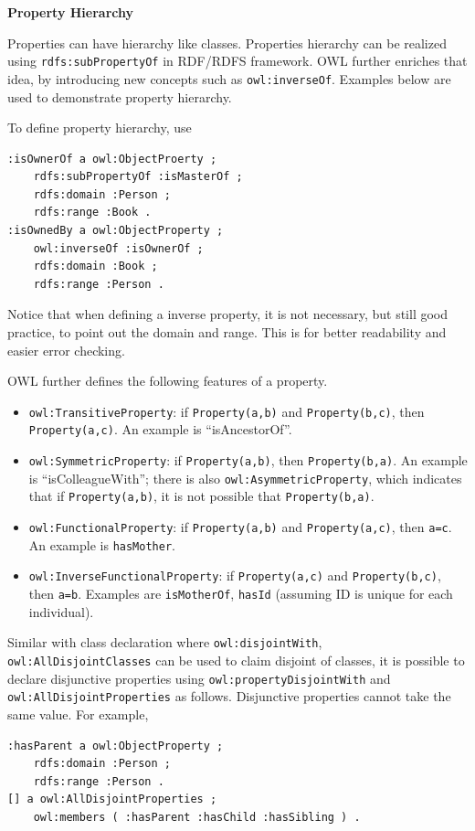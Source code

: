 \vspace{0.1in}
\noindent \textbf{Property Hierarchy}
\vspace{0.1in}

Properties can have hierarchy like classes. Properties hierarchy can be realized using \verb|rdfs:subPropertyOf| in RDF/RDFS framework. OWL further enriches that idea, by introducing new concepts such as \verb|owl:inverseOf|. Examples below are used to demonstrate property hierarchy.

To define property hierarchy, use
\begin{lstlisting}
:isOwnerOf a owl:ObjectProerty ;
	rdfs:subPropertyOf :isMasterOf ;
	rdfs:domain :Person ;
	rdfs:range :Book .
:isOwnedBy a owl:ObjectProperty ;
	owl:inverseOf :isOwnerOf ;
	rdfs:domain :Book ;
	rdfs:range :Person .
\end{lstlisting}
Notice that when defining a inverse property, it is not necessary, but still good practice, to point out the domain and range. This is for better readability and easier error checking.

OWL further defines the following features of a property.
\begin{itemize}
	\item \verb|owl:TransitiveProperty|: if \verb|Property(a,b)| and \verb|Property(b,c)|, then \verb|Property(a,c)|. An example is ``isAncestorOf''.
	\item \verb|owl:SymmetricProperty|: if \verb|Property(a,b)|, then \verb|Property(b,a)|. An example is ``isColleagueWith''; there is also \verb|owl:AsymmetricProperty|, which indicates that if \verb|Property(a,b)|, it is not possible that \verb|Property(b,a)|.
	\item \verb|owl:FunctionalProperty|: if \verb|Property(a,b)| and \verb|Property(a,c)|, then \verb|a=c|. An example is \verb|hasMother|.
	\item \verb|owl:InverseFunctionalProperty|: if \verb|Property(a,c)| and \verb|Property(b,c)|, then \verb|a=b|. Examples are \verb|isMotherOf|, \verb|hasId| (assuming ID is unique for each individual).
\end{itemize}

Similar with class declaration where \verb|owl:disjointWith|, \verb|owl:AllDisjointClasses| can be used to claim disjoint of classes, it is possible to declare disjunctive properties using \verb|owl:propertyDisjointWith| and \verb|owl:AllDisjointProperties| as follows. Disjunctive properties cannot take the same value. For example,
\begin{lstlisting}
:hasParent a owl:ObjectProperty ;
	rdfs:domain :Person ;
	rdfs:range :Person .
[] a owl:AllDisjointProperties ;
	owl:members ( :hasParent :hasChild :hasSibling ) .
\end{lstlisting}

